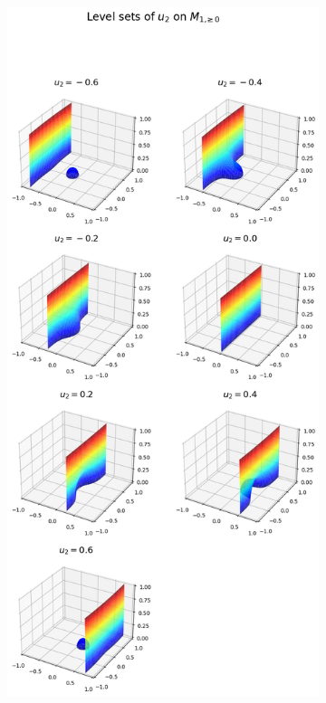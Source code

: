 \documentclass[titlepage,numbers=noenddot,headinclude,oneside,%
footinclude=true,cleardoublepage=empty,%
BCOR=5mm,paper=a4,fontsize=11pt,%
english,%
]{scrartcl}
\begin{document}
\begin{figure}
\begin{subfigure}{.45\textwidth}
        \includegraphics[width=\textwidth]{figures/level_sets_u2_unmodified.png}

\end{subfigure}
\end{figure}
\end{document}
